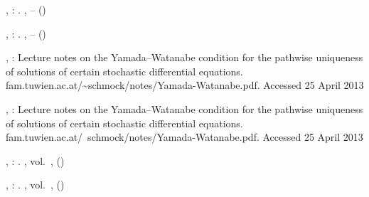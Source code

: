 \documentclass[numbers,compress,v1.0.1]{vmsta}
\theoremstyle{remark}
\begin{document}
\begin{thebibliography}{99}

%
\begin{barticle}
,
:
.
,
--
()
\end{barticle}
%
%
\OrigBibText
%
\begin{barticle}
,
:
.
,
--
()
\end{barticle}
%
\endOrigBibText
{}%
\endbibitem

%
\begin{botherref}
,
:
Lecture notes on the Yamada--Watanabe condition for the pathwise
uniqueness of
solutions of certain stochastic differential equations.
fam.tuwien.ac.at/\textasciitilde schmock/notes/Yamada-Watanabe.pdf. Accessed 25 April 2013
\end{botherref}
%
%
\OrigBibText
%
\begin{botherref}
,
:
Lecture notes on the Yamada--Watanabe condition for the pathwise
uniqueness of
solutions of certain stochastic differential equations.
fam.tuwien.ac.at/~schmock/notes/Yamada-Watanabe.pdf. Accessed 25 April 2013
\end{botherref}
%
\endOrigBibText
{}%
\endbibitem

%
\begin{bbook}
,
:
.
,
vol.~,
()
\end{bbook}
%
%
\OrigBibText
%
\begin{bbook}
,
:
.
,
vol.~,
()
\end{bbook}
%
\endOrigBibText
{}%
\endbibitem


\end{thebibliography}
\end{document}
